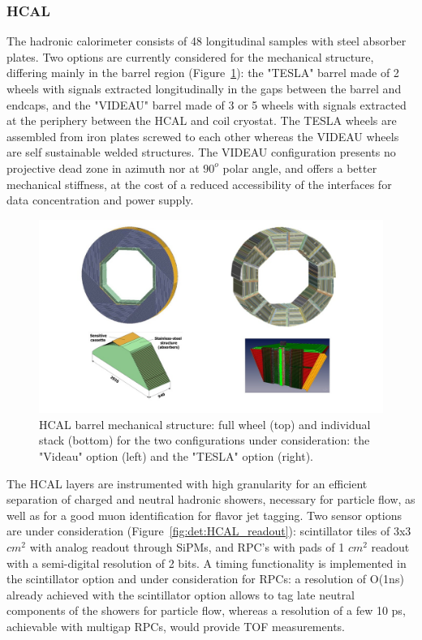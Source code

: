 \vspace{1cm}
\subsubsection*{\bf HCAL}

The hadronic calorimeter consists of 48 longitudinal samples with steel absorber plates. Two options are currently considered for the mechanical structure, differing mainly in the barrel region (Figure~\ref{fig:det:HCAL}): the "TESLA" barrel made of 2 wheels with signals extracted longitudinally in the gaps between the barrel and endcaps, and the "VIDEAU" barrel made of 3 or 5 wheels with signals extracted at the periphery between the HCAL and coil cryostat. The TESLA wheels are assembled from iron plates screwed to each other whereas the VIDEAU wheels are self sustainable welded structures. The VIDEAU configuration presents no projective dead zone in azimuth nor at $90^o$ polar angle, and offers a better mechanical stiffness, at the cost of a reduced accessibility of the interfaces for data concentration and power supply.

\begin{figure}[t!]
\centering
\includegraphics[width=1.1\hsize]{Detector/fig/HCAL_structure.jpg}
\caption{HCAL barrel mechanical structure: full wheel (top) and individual stack (bottom) for the two configurations under consideration: the "Videau" option (left) and the "TESLA" option (right).}
\label{fig:det:HCAL}
\end{figure}

The HCAL layers are instrumented with high granularity for an efficient separation of charged and neutral hadronic showers, necessary for particle flow, as well as for a good muon identification for flavor jet tagging. Two sensor options are under consideration (Figure~\ref{fig:det:HCAL_readout}): scintillator tiles of 3x3 $cm^2$ with analog readout through SiPMs, and RPC's with pads of 1 $cm^2$ readout with a semi-digital resolution of 2 bits. A timing functionality is implemented in the scintillator option and under consideration for RPCs: a resolution of O(1ns) already achieved with the scintillator option allows to tag late neutral components of the showers for particle flow, whereas a resolution of a few 10 ps, achievable with multigap RPCs, would provide TOF measurements. 

